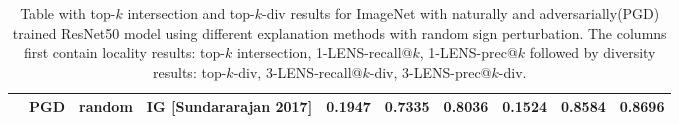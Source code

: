 \documentclass[letterpaper]{article} %
\begin{document}
\begin{table}[!ht]
\begin{center}
{\begin{tabular}{|l|l|c|c|c|c|c|c|c|c|}
& PGD & random & IG [Sundararajan 2017]  & 0.1947 & 0.7335 & 0.8036 & 0.1524 & 0.8584 & 0.8696 \\
\hline
\end{tabular}
}
\end{center}
    \caption{Table with top-$k$ intersection and top-$k$-div results for ImageNet with naturally and adversarially(PGD) trained ResNet50 model using different explanation methods with random sign perturbation. The columns first contain locality results: top-$k$ intersection, 1-LENS-recall@$k$, 1-LENS-prec@$k$ followed by diversity results: top-$k$-div, 3-LENS-recall@$k$-div, 3-LENS-prec@$k$-div.}
\label{table-topk-div-results-rand-imagenet-app}
\end{table}
\end{document}
